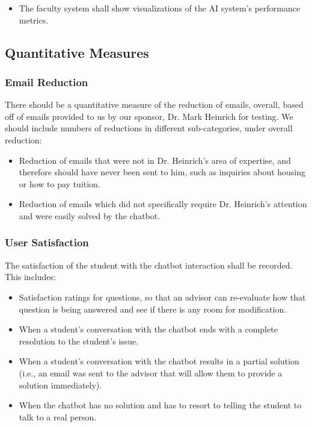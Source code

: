 \documentclass[titlepage, 12pt]{article}
\begin{document}
\begin{itemize}
    \item The faculty system shall show visualizations of the AI system’s performance metrics.
\end{itemize}

\subsection{Quantitative Measures}

\subsubsection{Email Reduction}

There should be a quantitative measure of the reduction of emails, overall, based off of emails provided to us by our sponsor, Dr. Mark Heinrich for testing. We should include numbers of reductions in different sub-categories, under overall reduction:

\begin{itemize}
    \item Reduction of emails that were not in Dr. Heinrich’s area of expertise, and therefore should have never been sent to him, such as inquiries about housing or how to pay tuition.
    \item Reduction of emails which did not specifically require Dr. Heinrich’s attention and were easily solved by the chatbot.
\end{itemize}

\subsubsection{User Satisfaction}

The satisfaction of the student with the chatbot interaction shall be recorded. This includes:

\begin{itemize}
    \item Satisfaction ratings for questions, so that an advisor can re-evaluate how that question is being answered and see if there is any room for modification.
    \item When a student’s conversation with the chatbot ends with a complete resolution to the student’s issue.
    \item When a student’s conversation with the chatbot results in a partial solution (i.e., an email was sent to the advisor that will allow them to provide a solution immediately).
    \item When the chatbot has no solution and has to resort to telling the student to talk to a real person.
\end{itemize}
\end{document}
